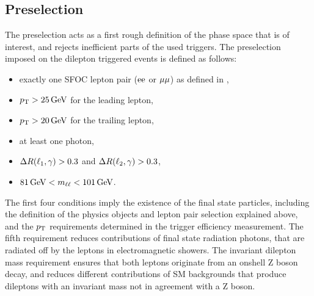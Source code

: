 \subsection{Preselection}
The preselection acts as a first rough definition of the phase space that is of interest, and rejects inefficient parts of the used triggers. The preselection imposed on the dilepton triggered events is defined as follows:
\begin{itemize}
 \item exactly one SFOC lepton pair ($\mathrm{e}\mathrm{e}$ or $\mu\mu$) as defined in ,
 \item $p_{\mathrm{T}}>25\,\text{Ge\hspace{-.08em}V}$ for the leading lepton,
 \item $p_{\mathrm{T}}>20\,\text{Ge\hspace{-.08em}V}$ for the trailing lepton,
 \item at least one photon,
 \item $\Delta R(\ell_1,\gamma)>0.3$ and $\Delta R(\ell_2,\gamma)>0.3$,
 \item $81\,\text{Ge\hspace{-.08em}V}<m_{\ell\ell}<101\,\text{Ge\hspace{-.08em}V}$.
\end{itemize}
The first four conditions imply the existence of the final state particles, including the definition of the physics objects and lepton pair selection explained above, and the $p_{\mathrm{T}}$ requirements determined in the trigger efficiency measurement. The fifth requirement reduces contributions of final state radiation photons, that are radiated off by the leptons in electromagnetic showers. The invariant dilepton mass requirement ensures that both leptons originate from an onshell Z boson decay, and reduces different contributions of SM backgrounds that produce dileptons with an invariant mass not in agreement with a Z boson.
